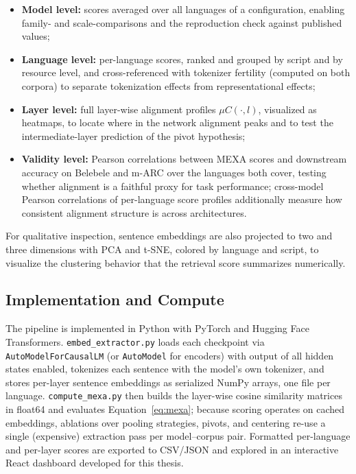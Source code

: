 \begin{itemize}
    \item \textbf{Model level:} scores averaged over all languages of a
    configuration, enabling family- and scale-comparisons and the
    reproduction check against published values;
    \item \textbf{Language level:} per-language scores, ranked and grouped
    by script and by resource level, and cross-referenced with tokenizer
    fertility (computed on both corpora) to separate tokenization effects
    from representational effects;
    \item \textbf{Layer level:} full layer-wise alignment profiles
    $\mu C(\cdot, l)$, visualized as heatmaps, to locate where in the
    network alignment peaks and to test the intermediate-layer prediction
    of the pivot hypothesis;
    \item \textbf{Validity level:} Pearson correlations between MEXA
    scores and downstream accuracy on Belebele
    \citep{bandarkar2024belebele} and m-ARC \citep{lai2023okapi} over the
    languages both cover, testing whether alignment is a faithful proxy
    for task performance; cross-model Pearson correlations of per-language
    score profiles additionally measure how consistent alignment
    structure is across architectures.
\end{itemize}

For qualitative inspection, sentence embeddings are also projected to two
and three dimensions with PCA and t-SNE, colored by language and script,
to visualize the clustering behavior that the retrieval score summarizes
numerically.

\subsection{Implementation and Compute}
\label{subsec:implementation}

The pipeline is implemented in Python with PyTorch and Hugging Face
Transformers. \texttt{embed\_extractor.py} loads each checkpoint via
\texttt{AutoModelForCausalLM} (or \texttt{AutoModel} for encoders) with
output of all hidden states enabled, tokenizes each sentence with the
model's own tokenizer, and stores per-layer sentence embeddings as
serialized NumPy arrays, one file per language.
\texttt{compute\_mexa.py} then builds the layer-wise cosine similarity
matrices in float64 and evaluates Equation~\eqref{eq:mexa}; because
scoring operates on cached embeddings, ablations over pooling strategies,
pivots, and centering re-use a single (expensive) extraction pass per
model--corpus pair. Formatted per-language and per-layer scores are
exported to CSV/JSON and explored in an interactive React dashboard
developed for this thesis.

